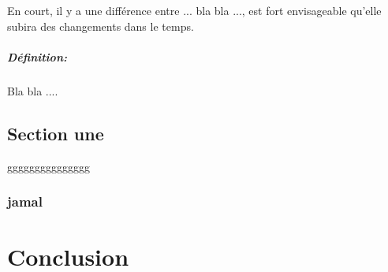 \documentclass[12pt, a4paper, openany]{report}
\begin{document}
 En court, il y a une différence entre ... bla bla ..., est fort envisageable qu’elle subira des changements dans le temps.
 
 \paragraph{Définition:}
  Bla bla ....

 \section{Section une}
  ggggggggggggggg
  \subsection{jamal}

\chapter*{Conclusion}
 

  
\end{document}
